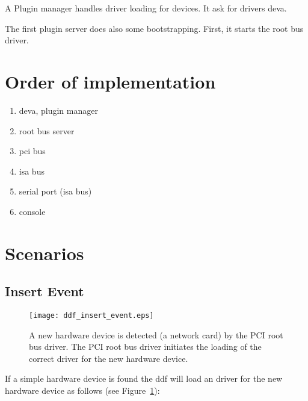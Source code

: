 A Plugin manager handles driver loading for devices.  It ask for drivers
deva.  

The first plugin server does also some bootstrapping.  First, it starts
the root bus driver.

\section{Order of implementation}

\begin{enumerate}
\item deva, plugin manager
\item root bus server
\item pci bus
\item isa bus
\item serial port  (isa bus)
\item console 
\end{enumerate}


\section{Scenarios}

\subsection{Insert Event}

\begin{figure}
  \begin{center}
    \leavevmode 
    \texttt{[image: ddf\_insert\_event.eps]}
  \end{center}
  \caption[New hardware detected]{A new hardware device is detected (a
  network card) by the PCI root bus driver.  The PCI root bus driver
  initiates the loading of the correct driver for the new hardware
  device.}
  \label{fig:ddf_insert_event}
\end{figure}

If a simple hardware device is found the ddf will load an driver for
the new hardware device as follows (see Figure~\ref{fig:ddf_insert_event}):

